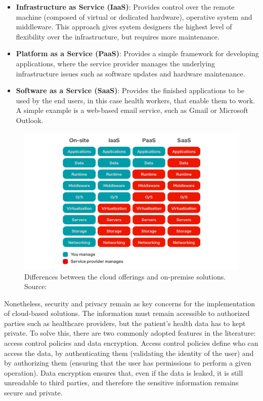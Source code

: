 \begin{itemize}
    \item \textbf{Infrastructure as Service (IaaS)}: Provides control over the remote machine (composed of virtual or dedicated hardware), operative system and middleware. This approach gives system designers the highest level of flexibility over the infrastructure, but requires more maintenance.
    \item \textbf{Platform as a Service (PaaS)}: Provides a simple framework for developing applications, where the service provider manages the underlying infrastructure issues such as software updates and hardware maintenance. 
    \item \textbf{Software as a Service (SaaS)}: Provides the finished applications to be used by the end users, in this case health workers, that enable them to work. A simple example is a web-based email service, such as Gmail or Microsoft Outlook. 
\end{itemize}

\begin{figure}[H]
    \centering
    \includegraphics[width=\linewidth]{images/cloud-services.png}
    \caption[Differences between the cloud offerings and on-premise solutions.]{ Differences between the cloud offerings and on-premise solutions. Source: \cite{RedHat2021}}
    \label{fig:differences-between-cloud-services}
\end{figure}

Nonetheless, security and privacy remain as key concerns for the implementation of cloud-based solutions. The information must remain accessible to authorized parties such as healthcare providers, but the patient's health data has to kept private. To solve this, there are two commonly adopted features in the literature: access control policies and data encryption\cite{}. Access control policies define who can access the data, by authenticating them (validating the identity of the user) and by authorizing them (ensuring that the user has permissions to perform a given operation). Data encryption ensures that, even if the data is leaked, it is still unreadable to third parties, and therefore the sensitive information remains secure and private.

